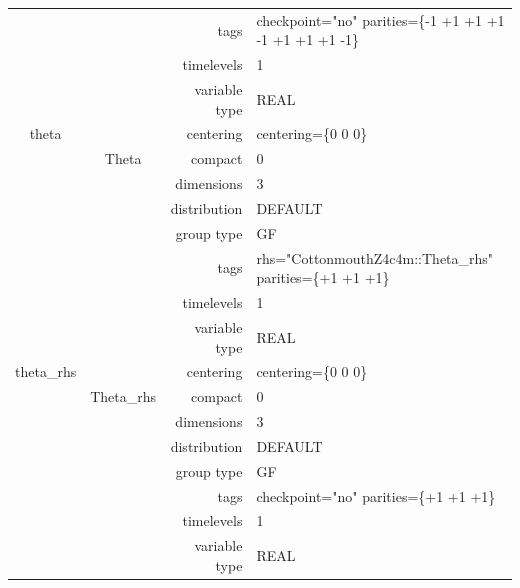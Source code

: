 \begin{tabular*}{150mm}{|c|c@{\extracolsep{\fill}}|rl|}
 &  & tags & checkpoint="no" parities=\{-1 +1 +1  +1 -1 +1  +1 +1 -1\} \\ 
 &  & timelevels & 1 \\ 
 &  & variable type & REAL \\ 
\hline 
theta &  & centering & centering=\{0 0 0\} \\ 
 & Theta & compact & 0 \\ 
 &  & dimensions & 3 \\ 
 &  & distribution & DEFAULT \\ 
 &  & group type & GF \\ 
 &  & tags & rhs="CottonmouthZ4c4m::Theta\_rhs" parities=\{+1 +1 +1\} \\ 
 &  & timelevels & 1 \\ 
 &  & variable type & REAL \\ 
\hline 
theta\_rhs &  & centering & centering=\{0 0 0\} \\ 
 & Theta\_rhs & compact & 0 \\ 
 &  & dimensions & 3 \\ 
 &  & distribution & DEFAULT \\ 
 &  & group type & GF \\ 
 &  & tags & checkpoint="no" parities=\{+1 +1 +1\} \\ 
 &  & timelevels & 1 \\ 
 &  & variable type & REAL \\ 
\hline 
\end{tabular*} 



\vspace{5mm}
\vspace{5mm}

